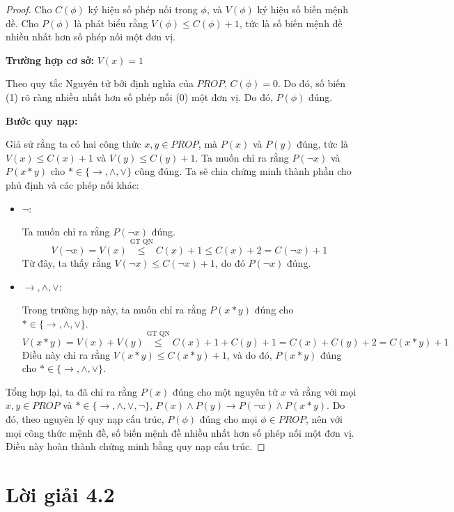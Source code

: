 \documentclass[12pt,a4paper]{article}
\theoremstyle{definition}
\begin{document}
\begin{proof}
Cho $C(\phi)$ ký hiệu số phép nối trong $\phi$, và $V(\phi)$ ký hiệu số biến mệnh đề. Cho $P(\phi)$ là phát biểu rằng $V(\phi) \le C(\phi) + 1$, tức là số biến mệnh đề nhiều nhất hơn số phép nối một đơn vị.

\textbf{Trường hợp cơ sở:} $V(x) = 1$

Theo quy tắc Nguyên tử bởi định nghĩa của $\textit{PROP}$, $C(\phi) = 0$. Do đó, số biến (1) rõ ràng nhiều nhất hơn số phép nối (0) một đơn vị. Do đó, $P(\phi)$ đúng.

\textbf{Bước quy nạp:}

Giả sử rằng ta có hai công thức $x, y \in \textit{PROP}$, mà $P(x)$ và $P(y)$ đúng, tức là $V(x) \le C(x) + 1$ và $V(y) \le C(y) + 1$. Ta muốn chỉ ra rằng $P(\neg x)$ và $P(x * y)$ cho $* \in \{\to, \land, \lor\}$ cũng đúng. Ta sẽ chia chứng minh thành phần cho phủ định và các phép nối khác:

\begin{itemize}
\item $\neg$:

Ta muốn chỉ ra rằng $P(\neg x)$ đúng.
\[V(\neg x) = V(x) \overset{\text{GT QN}}{\le} C(x) + 1 \le C(x) + 2 = C(\neg x) + 1\]
Từ đây, ta thấy rằng $V(\neg x) \le C(\neg x) + 1$, do đó $P(\neg x)$ đúng.

\item $\to, \land, \lor$:

Trong trường hợp này, ta muốn chỉ ra rằng $P(x * y)$ đúng cho $* \in \{\to, \land, \lor\}$.
\[V(x * y) = V(x) + V(y) \overset{\text{GT QN}}{\le} C(x) + 1 + C(y) + 1 = C(x) + C(y) + 2 = C(x * y) + 1\]
Điều này chỉ ra rằng $V(x * y) \le C(x * y) + 1$, và do đó, $P(x * y)$ đúng cho $* \in \{\to, \land, \lor\}$.
\end{itemize}

Tổng hợp lại, ta đã chỉ ra rằng $P(x)$ đúng cho một nguyên tử $x$ và rằng với mọi $x, y \in \textit{PROP}$ và $* \in \{\to, \land, \lor, \neg\}$, $P(x) \land P(y) \to P(\neg x) \land P(x * y)$. Do đó, theo nguyên lý quy nạp cấu trúc, $P(\phi)$ đúng cho mọi $\phi \in \textit{PROP}$, nên với mọi công thức mệnh đề, số biến mệnh đề nhiều nhất hơn số phép nối một đơn vị. Điều này hoàn thành chứng minh bằng quy nạp cấu trúc.
\end{proof}

\section*{Lời giải 4.2}
\end{document}
